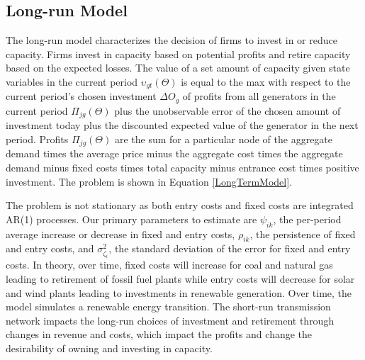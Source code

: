 \documentclass[12pt]{article}
\begin{document}
\subsection{Long-run Model}

The long-run model characterizes the decision of firms to invest in or reduce capacity. Firms invest in capacity based on potential profits and retire capacity based on the expected losses. The value of a set amount of capacity given state variables in the current period $\upsilon_{gt}(\Theta)$ is equal to the max with respect to the current period's chosen investment $\Delta O_{g}$ of profits from all generators in the current period $\Pi_{jg}(\Theta)$ plus the unobservable error of the chosen amount of investment today plus the discounted expected value of the generator in the next period. Profits $\Pi_{jg}(\Theta)$ are the sum for a particular node of the aggregate demand times the average price minus the aggregate cost times the aggregate demand minus fixed costs times total capacity minus entrance cost times positive investment. The problem is shown in Equation \ref{LongTermModel}.

The problem is not stationary as both entry costs and fixed costs are integrated AR(1) processes. Our primary parameters to estimate are $\psi_{ik}$, the per-period average increase or decrease in fixed and entry costs, $\rho_{ik}$, the persistence of fixed and entry costs, and $\sigma^2_{\zeta_i}$, the standard deviation of the error for fixed and entry costs. In theory, over time, fixed costs will increase for coal and natural gas leading to retirement of fossil fuel plants while entry costs will decrease for solar and wind plants leading to investments in renewable generation. Over time, the model simulates a renewable energy transition. The short-run transmission network impacts the long-run choices of investment and retirement through changes in revenue and costs, which impact the profits and change the desirability of owning and investing in capacity.
\end{document}
